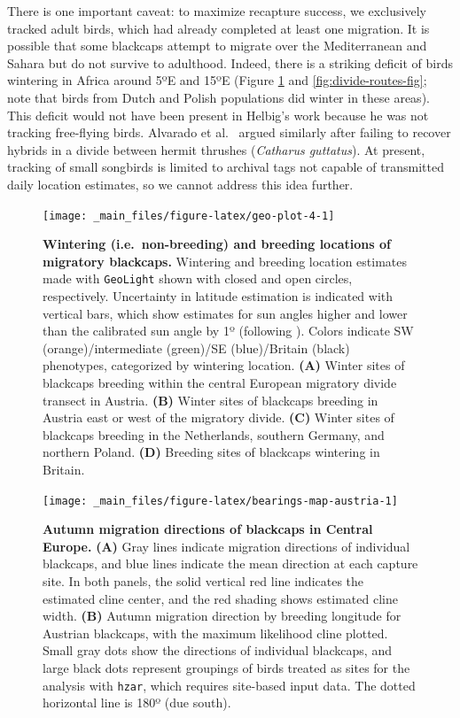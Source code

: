 \documentclass[a4paper, twoside]{templates/ociamthesis}
\begin{document}
There is one important caveat: to maximize recapture success, we exclusively tracked adult birds, which had already completed at least one migration. It is possible that some blackcaps attempt to migrate over the Mediterranean and Sahara but do not survive to adulthood. Indeed, there is a striking deficit of birds wintering in Africa around 5ºE and 15ºE (Figure \ref{fig:geo-plot-4} and \ref{fig:divide-routes-fig}; note that birds from Dutch and Polish populations did winter in these areas). This deficit would not have been present in Helbig's work because he was not tracking free-flying birds. Alvarado et al.~\autocite{alvaradoIntegrativeTrackingMethods2014} argued similarly after failing to recover hybrids in a divide between hermit thrushes (\emph{Catharus guttatus}). At present, tracking of small songbirds is limited to archival tags not capable of transmitted daily location estimates, so we cannot address this idea further.



\begin{figure}
\texttt{[image: \_main\_files/figure-latex/geo-plot-4-1]} \caption{\textbf{Wintering (i.e.~non-breeding) and breeding locations of migratory blackcaps.} Wintering and breeding location estimates made with \texttt{GeoLight} shown with closed and open circles, respectively. Uncertainty in latitude estimation is indicated with vertical bars, which show estimates for sun angles higher and lower than the calibrated sun angle by 1º (following \autocite{hiemerFirstTracksIndividual2018}). Colors indicate SW (orange)/intermediate (green)/SE (blue)/Britain (black) phenotypes, categorized by wintering location. \textbf{(A)} Winter sites of blackcaps breeding within the central European migratory divide transect in Austria. \textbf{(B)} Winter sites of blackcaps breeding in Austria east or west of the migratory divide. \textbf{(C)} Winter sites of blackcaps breeding in the Netherlands, southern Germany, and northern Poland. \textbf{(D)} Breeding sites of blackcaps wintering in Britain.}\label{fig:geo-plot-4}
\end{figure}



\begin{figure}
\texttt{[image: \_main\_files/figure-latex/bearings-map-austria-1]} \caption{\textbf{Autumn migration directions of blackcaps in Central Europe.} \textbf{(A)} Gray lines indicate migration directions of individual blackcaps, and blue lines indicate the mean direction at each capture site. In both panels, the solid vertical red line indicates the estimated cline center, and the red shading shows estimated cline width. \textbf{(B)} Autumn migration direction by breeding longitude for Austrian blackcaps, with the maximum likelihood cline plotted. Small gray dots show the directions of individual blackcaps, and large black dots represent groupings of birds treated as sites for the analysis with \texttt{hzar}, which requires site-based input data. The dotted horizontal line is 180º (due south).}\label{fig:bearings-map-austria}
\end{figure}
\end{document}

